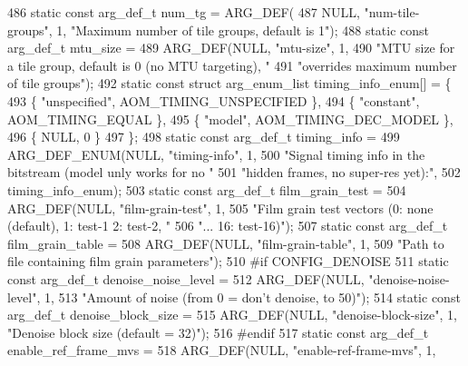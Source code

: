 \begin{DoxyCodeInclude}
{{{{{{{486 \textcolor{keyword}{static} \textcolor{keyword}{const} arg\_def\_t num\_tg = ARG\_DEF(
487     NULL, \textcolor{stringliteral}{"num-tile-groups"}, 1, \textcolor{stringliteral}{"Maximum number of tile groups, default is 1"});
488 \textcolor{keyword}{static} \textcolor{keyword}{const} arg\_def\_t mtu\_size =
489     ARG\_DEF(NULL, \textcolor{stringliteral}{"mtu-size"}, 1,
490         \textcolor{stringliteral}{"MTU size for a tile group, default is 0 (no MTU targeting), "}
491         \textcolor{stringliteral}{"overrides maximum number of tile groups"});
492 \textcolor{keyword}{static} \textcolor{keyword}{const} \textcolor{keyword}{struct }arg\_enum\_list timing\_info\_enum[] = \{
493     \{ \textcolor{stringliteral}{"unspecified"}, AOM\_TIMING\_UNSPECIFIED \},
494     \{ \textcolor{stringliteral}{"constant"}, AOM\_TIMING\_EQUAL \},
495     \{ \textcolor{stringliteral}{"model"}, AOM\_TIMING\_DEC\_MODEL \},
496     \{ NULL, 0 \}
497 \};
498 \textcolor{keyword}{static} \textcolor{keyword}{const} arg\_def\_t timing\_info =
499     ARG\_DEF\_ENUM(NULL, \textcolor{stringliteral}{"timing-info"}, 1,
500         \textcolor{stringliteral}{"Signal timing info in the bitstream (model unly works for no "}
501         \textcolor{stringliteral}{"hidden frames, no super-res yet):"},
502         timing\_info\_enum);
503 \textcolor{keyword}{static} \textcolor{keyword}{const} arg\_def\_t film\_grain\_test =
504     ARG\_DEF(NULL, \textcolor{stringliteral}{"film-grain-test"}, 1,
505         \textcolor{stringliteral}{"Film grain test vectors (0: none (default), 1: test-1  2: test-2, "}
506         \textcolor{stringliteral}{"... 16: test-16)"});
507 \textcolor{keyword}{static} \textcolor{keyword}{const} arg\_def\_t film\_grain\_table =
508     ARG\_DEF(NULL, \textcolor{stringliteral}{"film-grain-table"}, 1,
509         \textcolor{stringliteral}{"Path to file containing film grain parameters"});
510 \textcolor{preprocessor}{#if CONFIG\_DENOISE}
511 \textcolor{keyword}{static} \textcolor{keyword}{const} arg\_def\_t denoise\_noise\_level =
512     ARG\_DEF(NULL, \textcolor{stringliteral}{"denoise-noise-level"}, 1,
513         \textcolor{stringliteral}{"Amount of noise (from 0 = don't denoise, to 50)"});
514 \textcolor{keyword}{static} \textcolor{keyword}{const} arg\_def\_t denoise\_block\_size =
515     ARG\_DEF(NULL, \textcolor{stringliteral}{"denoise-block-size"}, 1, \textcolor{stringliteral}{"Denoise block size (default = 32)"});
516 \textcolor{preprocessor}{#endif}
517 \textcolor{keyword}{static} \textcolor{keyword}{const} arg\_def\_t enable\_ref\_frame\_mvs =
518     ARG\_DEF(NULL, \textcolor{stringliteral}{"enable-ref-frame-mvs"}, 1,
}}}}}}}
\end{DoxyCodeInclude}
